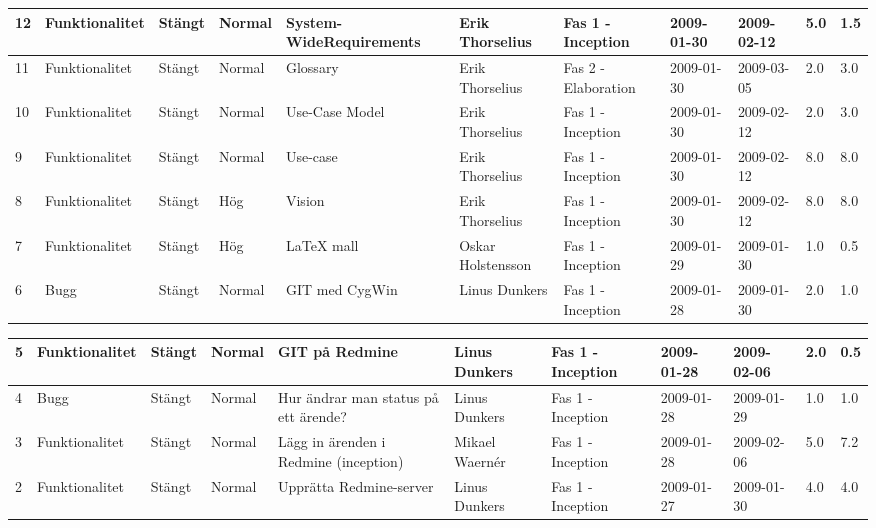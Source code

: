 \begin{center}
\begin{tabular}{| m{0.5cm} | l | l | l | m{5cm} | l | l | l | l | m{1.5cm} | m{1.5cm} |}
\hline 12 & Funktionalitet & Stängt & Normal & System-WideRequirements & Erik Thorselius & Fas 1 - Inception & 2009-01-30 & 2009-02-12 & 5.0 & 1.5 \\
\hline 11 & Funktionalitet & Stängt & Normal & Glossary & Erik Thorselius & Fas 2 - Elaboration & 2009-01-30 & 2009-03-05 & 2.0 & 3.0 \\
\hline 10 & Funktionalitet & Stängt & Normal & Use-Case Model & Erik Thorselius & Fas 1 - Inception & 2009-01-30 & 2009-02-12 & 2.0 & 3.0 \\
\hline 9 & Funktionalitet & Stängt & Normal & Use-case & Erik Thorselius & Fas 1 - Inception & 2009-01-30 & 2009-02-12 & 8.0 & 8.0 \\
\hline 8 & Funktionalitet & Stängt & Hög & Vision & Erik Thorselius & Fas 1 - Inception & 2009-01-30 & 2009-02-12 & 8.0 & 8.0 \\
\hline 7 & Funktionalitet & Stängt & Hög & LaTeX mall & Oskar Holstensson & Fas 1 - Inception & 2009-01-29 & 2009-01-30 & 1.0 & 0.5 \\
\hline 6 & Bugg & Stängt & Normal & GIT med CygWin & Linus Dunkers & Fas 1 - Inception & 2009-01-28 & 2009-01-30 & 2.0 & 1.0 \\
		\hline
	\end{tabular}
\end{center}
\newpage
\begin{center}
	\begin{tabular}{| m{0.5cm} | l | l | l | m{5cm} | l | l | l | l | m{1.5cm} | m{1.5cm} |}
\hline 5 & Funktionalitet & Stängt & Normal & GIT på Redmine & Linus Dunkers & Fas 1 - Inception & 2009-01-28 & 2009-02-06 & 2.0 & 0.5 \\
\hline 4 & Bugg & Stängt & Normal & Hur ändrar man status på ett ärende? & Linus Dunkers & Fas 1 - Inception & 2009-01-28 & 2009-01-29 & 1.0 & 1.0 \\
\hline 3 & Funktionalitet & Stängt & Normal & Lägg in ärenden i Redmine (inception) & Mikael Waernér & Fas 1 - Inception & 2009-01-28 & 2009-02-06 & 5.0 & 7.2 \\
\hline 2 & Funktionalitet & Stängt & Normal & Upprätta Redmine-server & Linus Dunkers & Fas 1 - Inception & 2009-01-27 & 2009-01-30 & 4.0 & 4.0 \\
		\hline
	\end{tabular}
\end{center}



